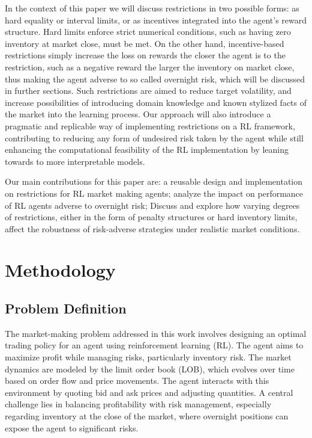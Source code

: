 \documentclass{article}
\begin{document}
⁤In the context of this paper we will discuss restrictions in two possible forms: as hard equality or interval limits, or as incentives integrated into the agent's reward structure. ⁤⁤Hard limits enforce strict numerical conditions, such as having zero inventory at market close, must be met. ⁤⁤On the other hand, incentive-based restrictions simply increase the loss on rewards the closer the agent is to the restriction, such as a negative reward the larger the inventory on market close, thus making the agent adverse to so called overnight risk, which will be discussed in further sections. Such restrictions are aimed to reduce target volatility, and increase possibilities of introducing domain knowledge and known stylized facts of the market into the learning process. ⁤⁤Our approach will also introduce a pragmatic and replicable way of implementing restrictions on a RL framework, contributing to reducing any form of undesired risk taken by the agent while still enhancing the computational feasibility of the RL implementation by leaning towards to more interpretable models. ⁤

Our main contributions for this paper are: a reusable design and implementation on restrictions for RL market making agents; analyze the impact on performance of RL agents adverse to overnight risk; Discuss and explore how varying degrees of restrictions, either in the form of penalty structures or hard inventory limits, affect the robustness of risk-adverse strategies under realistic market conditions.

\section{Methodology}

\subsection{Problem Definition}
The market-making problem addressed in this work involves designing an optimal trading policy for an agent using reinforcement learning (RL). The agent aims to maximize profit while managing risks, particularly inventory risk. The market dynamics are modeled by the limit order book (LOB), which evolves over time based on order flow and price movements. The agent interacts with this environment by quoting bid and ask prices and adjusting quantities. A central challenge lies in balancing profitability with risk management, especially regarding inventory at the close of the market, where overnight positions can expose the agent to significant risks.
\end{document}
